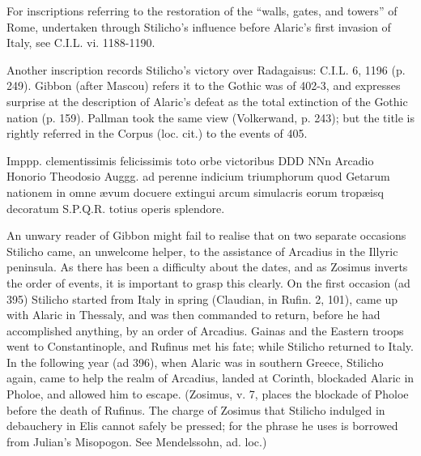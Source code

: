 For inscriptions referring to the restoration of the \texthebrew{“}walls, gates, and towers\texthebrew{}” of Rome, undertaken through Stilicho\texthebrew{}’s influence before Alaric\texthebrew{}’s first invasion of Italy, see C.I.L. vi. 1188-1190.

Another inscription records Stilicho\texthebrew{}’s victory over Radagaisus: C.I.L. 6, 1196 (p. 249). Gibbon (after Mascou) refers it to the Gothic was of 402-3, and expresses surprise at the description of Alaric\texthebrew{}’s defeat as the total extinction of the Gothic nation (p. 159). Pallman took the same view (Volkerwand, p. 243); but the title is rightly referred in the Corpus (loc. cit.) to the events of 405.

Imppp. clementissimis felicissimis toto orbe victoribus DDD NNn Arcadio Honorio Theodosio Auggg. ad perenne indicium triumphorum quod Getarum nationem in omne ævum docuere extingui arcum simulacris eorum tropæisq decoratum S.P.Q.R. totius operis splendore.


An unwary reader of Gibbon might fail to realise that on two separate occasions Stilicho came, an unwelcome helper, to the assistance of Arcadius in the Illyric peninsula. As there has been a difficulty about the dates, and as Zosimus inverts the order of events, it is important to grasp this clearly. On the first occasion (ad 395) Stilicho started from Italy in spring (Claudian, in Rufin. 2, 101), came up with Alaric in Thessaly, and was then commanded to return, before he had accomplished anything, by an order of Arcadius. Gainas and the Eastern troops went to Constantinople, and Rufinus met his fate; while Stilicho returned to Italy. In the following year (ad 396), when Alaric was in southern Greece, Stilicho again, came to help the realm of Arcadius, landed at Corinth, blockaded Alaric in Pholoe, and allowed him to escape. (Zosimus, v. 7, places the blockade of Pholoe before the death of Rufinus. The charge of Zosimus that Stilicho indulged in debauchery in Elis cannot safely be pressed; for the phrase he uses is borrowed from Julian\texthebrew{}’s Misopogon. See Mendelssohn, ad. loc.)

